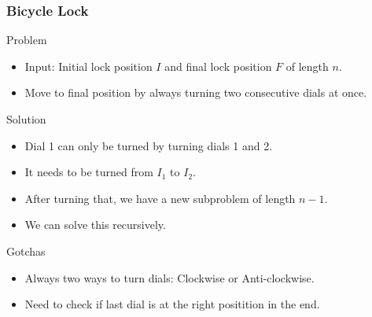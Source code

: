 \documentclass{beamer}
\begin{document}
\begin{frame}
    \frametitle{Bicycle Lock}
    \begin{block}{Problem}
        \begin{itemize}
            \item Input: Initial lock position $I$ and final lock position $F$ of length $n$.
            \item Move to final position by always turning two consecutive dials at once.
        \end{itemize}
    \end{block} \pause
    \begin{block}{Solution}
        \begin{itemize}
            \item Dial 1 can only be turned by turning dials 1 and 2.
            \pause
            \item It needs to be turned from $I_1$ to $I_2$.
            \pause
            \item After turning that, we have a new subproblem of length $n-1$.
            \pause
            \item We can solve this recursively.
        \end{itemize}
    \end{block} \pause
    \begin{block}{Gotchas}
        \begin{itemize}
            \item Always two ways to turn dials: Clockwise or Anti-clockwise.
            \pause
            \item Need to check if last dial is at the right positition in the end.
        \end{itemize}
    \end{block} 
\end{frame}
\end{document}
